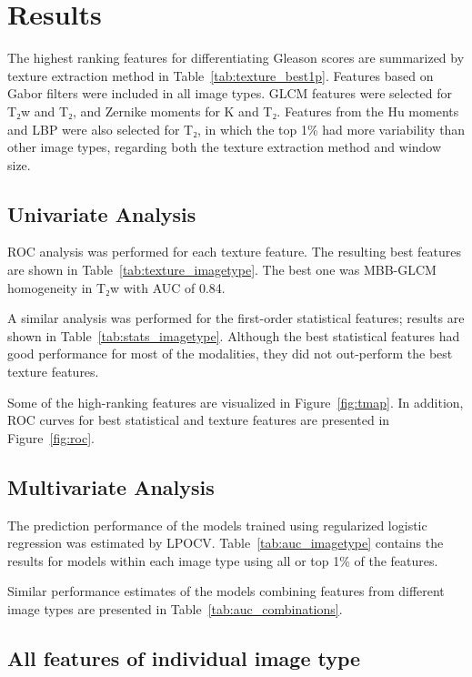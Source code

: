 \section{Results}

The highest ranking features for differentiating Gleason scores are summarized
by texture extraction method in Table~\ref{tab:texture_best1p}. Features based
on Gabor filters were included in all image types. GLCM features were selected
for T₂w and T₂, and Zernike moments for K and T₂. Features from the Hu
moments and LBP were also selected for T₂, in which the top 1\% had more
variability than other image types, regarding both the texture extraction method
and window size.


\subsection{Univariate Analysis}

ROC analysis was performed for each texture feature. The resulting best features
are shown in Table~\ref{tab:texture_imagetype}. The best one was MBB-GLCM
homogeneity in T₂w with AUC of 0.84.

A similar analysis was performed for the first-order statistical features;
results are shown in Table~\ref{tab:stats_imagetype}. Although the best
statistical features had good performance for most of the modalities, they did
not out-perform the best texture features.

Some of the high-ranking features are visualized in Figure~\ref{fig:tmap}. In
addition, ROC curves for best statistical and texture features are presented in
Figure~\ref{fig:roc}.


\subsection{Multivariate Analysis}

The prediction performance of the models trained using regularized logistic
regression was estimated by LPOCV\@. Table~\ref{tab:auc_imagetype} contains the
results for models within each image type using all or top 1\% of the features.

Similar performance estimates of the models combining features from different
image types are presented in Table~\ref{tab:auc_combinations}.


\subsection{All features of individual image type}

